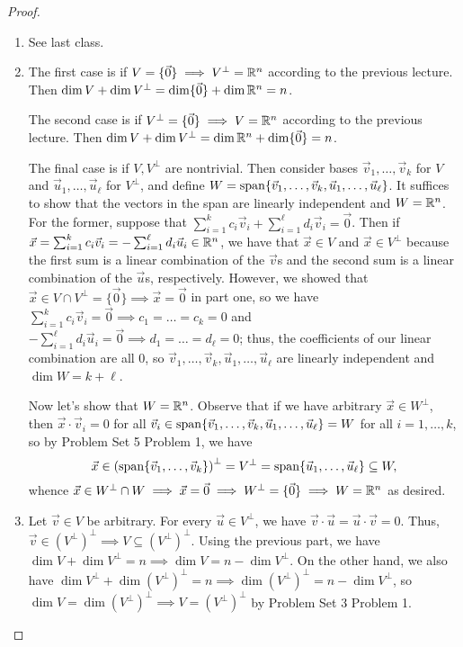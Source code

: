 \documentclass[main.tex]{subfiles}
\begin{document}
\begin{proof}
    \begin{enumerate}
        \item See last class.
        \item The first case is if $V = \{\vec{0}\}\implies V^\perp = \mathbb R^n$ according to the previous lecture. Then $\dim V + \dim V^\perp = \dim \{\vec{0}\} + \dim \mathbb R^n = n$.

        The second case is if $V^\perp = \{\vec{0}\}\implies V = \mathbb R^n$ according to the previous lecture. Then $\dim V + \dim V^\perp = \dim \mathbb R^n + \dim \{\vec{0}\} = n$.

        The final case is if $V, V^\perp$ are nontrivial. Then consider bases $\vec{v}_1, \ldots , \vec{v}_k$ for $V$ and $\vec{u}_1, \ldots , \vec{u}_\ell$ for $V^\perp$, and define $W = \operatorname{span}\{\vec{v}_1, \ldots , \vec{v}_k, \vec{u}_1, \ldots , \vec{u}_\ell\}$. It suffices to show that the vectors in the span are linearly independent and $W = \mathbb R^n$. For the former, suppose that $\sum_{i = 1}^kc_i\vec{v}_i + \sum_{i = 1}^\ell d_i\vec{v}_i = \vec{0}$. Then if $\vec{x} = \sum_{i = 1}^k c_i\vec{v}_i = -\sum_{i = 1}^\ell d_i\vec{u}_i\in \mathbb R^n$, we have that $\vec{x}\in V$ and $\vec{x}\in V^\perp$ because the first sum is a linear combination of the $\vec{v}$s and the second sum is a linear combination of the $\vec{u}$s, respectively. However, we showed that $\vec{x}\in V\cap V^\perp = \{\vec{0}\}\implies \vec{x} = \vec{0}$ in part one, so we have $ \sum_{i = 1}^k c_i\vec{v}_i = \vec{0}\implies c_1 = \ldots = c_k = 0$ and $-\sum_{i = 1}^\ell d_i\vec{u}_i = \vec{0}\implies d_1 = \ldots = d_\ell = 0$; thus, the coefficients of our linear combination are all 0, so $\vec{v}_1, \ldots , \vec{v}_k, \vec{u}_1, \ldots , \vec{u}_\ell$ are linearly independent and $\dim W = k + \ell$. 
        
        Now let's show that $W = \mathbb R^n$. Observe that if we have arbitrary $\vec{x}\in W^\perp$, then $\vec{x}\cdot \vec{v}_i = 0$ for all $\vec{v}_i\in \operatorname{span}\{\vec{v}_1, \ldots , \vec{v}_k, \vec{u}_1, \ldots , \vec{u}_\ell\} = W$ for all $i = 1, \ldots , k$, so by Problem Set 5 Problem 1, we have
        \[\vec{x}\in \left(\operatorname{span}\{\vec{v}_1, \ldots , \vec{v}_k\}\right)^\perp = V^\perp = \operatorname{span}\{\vec{u}_1, \ldots , \vec{u}_\ell\}\subseteq W,\]
        whence $\vec{x}\in W^\perp \cap W\implies \vec{x} = \vec{0}\implies W^\perp = \{\vec{0}\}\implies W = \mathbb R^n$ as desired.

        \item Let $\vec{v}\in V$ be arbitrary. For every $\vec{u}\in V^\perp$, we have $\vec{v}\cdot \vec{u} = \vec{u}\cdot \vec{v} = 0$. Thus, $\vec{v}\in (V^\perp)^\perp\implies V\subseteq (V^\perp)^\perp$. Using the previous part, we have $\dim V + \dim V^\perp = n\implies \dim V = n - \dim V^\perp$. On the other hand, we also have $\dim V^\perp + \dim (V^\perp)^\perp = n \implies \dim (V^\perp)^\perp = n - \dim V^\perp$, so $\dim V = \dim (V^\perp)^\perp\implies V = (V^\perp)^\perp$ by Problem Set 3 Problem 1.\qedhere
    \end{enumerate}
\end{proof}
\end{document}
